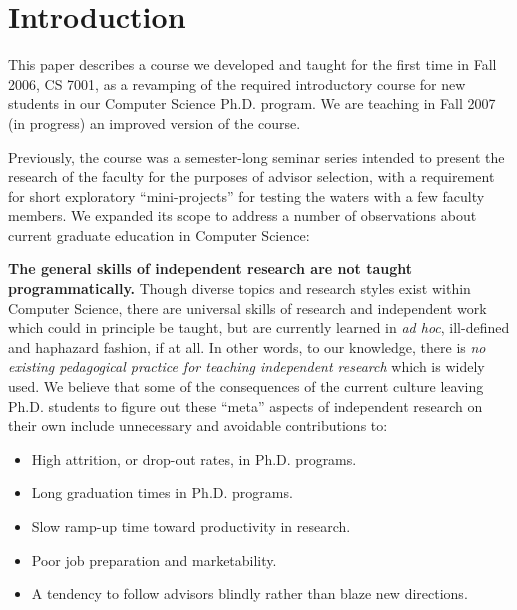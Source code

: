 \section{Introduction}

This paper describes a course we developed and taught for the first
time in Fall 2006, CS 7001, as a revamping of the required
introductory course for new students in our Computer Science Ph.D.
program.  We are teaching in Fall 2007 (in progress)
an improved version of the course.

Previously, the course was a semester-long seminar series
intended to present the research of the faculty for
the purposes of advisor selection, with a requirement for short
exploratory ``mini-projects'' for testing the waters with a few faculty
members.  We expanded its scope to
address a number of observations about current graduate education in
Computer Science:

{\bf The general skills of independent research are not taught
programmatically.}  Though diverse topics and research styles exist
within Computer Science, there are universal skills of research and
independent work which could in principle be taught, but are currently
learned in {\it ad hoc}, ill-defined and haphazard fashion, if at all.
In other words, to our knowledge, there is {\it no existing
pedagogical practice for teaching independent research} which is widely
used.
We believe that some of the consequences of the current culture
leaving Ph.D. students to figure out these ``meta'' aspects of
independent research on their own include unnecessary and avoidable
contributions to:
  \begin{itemize}
\itemsep=-1pt
  \item High attrition, or drop-out rates, in Ph.D. programs.
  \item Long graduation times in Ph.D. programs.
  \item Slow ramp-up time toward productivity in research.
  \item Poor job preparation and marketability.
  \item A tendency to follow advisors blindly rather than blaze new directions.
  \end{itemize}

